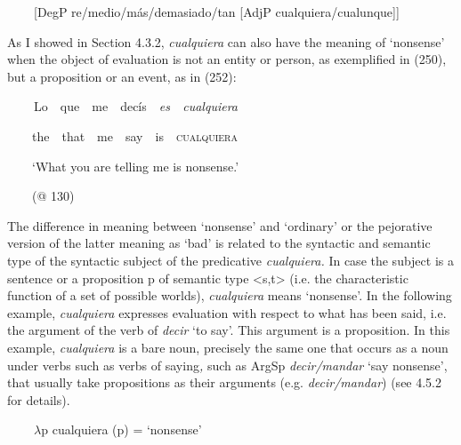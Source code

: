 \begin{styleStandard}
\textbf{\ \ }\ \ [DegP re/medio/más/demasiado/tan [AdjP cualquiera/cualunque]]
\end{styleStandard}

\begin{styleStandard}
As I showed in Section 4.3.2, \textit{cualquiera} can also have the meaning of ‘nonsense’ when the object of evaluation is not an entity or person, as exemplified in (250), but a proposition or an event, as in (252):
\end{styleStandard}

\begin{styleStandard}
\textbf{\ \ }\ \ Lo\ \ que\ \ me\ \ decís\ \ \textit{es\ \ cualquiera}
\end{styleStandard}

\begin{styleStandard}
\ \ \ \ the\ \ that\ \ me\ \ say\ \ is\ \ \textsc{cualquiera}
\end{styleStandard}

\begin{styleStandard}
\ \ \ \ ‘What you are telling me is nonsense.’
\end{styleStandard}

\begin{styleStandard}
\ \ \ \ (@ 130)
\end{styleStandard}

\begin{styleStandard}
The difference in meaning between ‘nonsense’ and ‘ordinary’ or the pejorative version of the latter meaning as ‘bad’ is related to the syntactic and semantic type of the syntactic subject of the predicative \textit{cualquiera.} In case the subject is a sentence or a proposition p of semantic type {\textless}s,t{\textgreater} (i.e. the characteristic function of a set of possible worlds), \textit{cualquiera} means ‘nonsense’. In the following example, \textit{cualquiera} expresses evaluation with respect to what has been said, i.e. the argument of the verb of \textit{decir} ‘to say’. This argument is a proposition. In this example, \textit{cualquiera} is a bare noun, precisely the same one that occurs as a noun under verbs such as verbs of saying\textit{,} such as ArgSp\textit{ decir/mandar} ‘say nonsense’, that usually take propositions as their arguments (e.g. \textit{decir/mandar}) (see 4.5.2 for details). 
\end{styleStandard}

\begin{styleStandard}
\textbf{\ \ }\ \ $\lambda $p cualquiera (p) = ‘nonsense’
\end{styleStandard}

